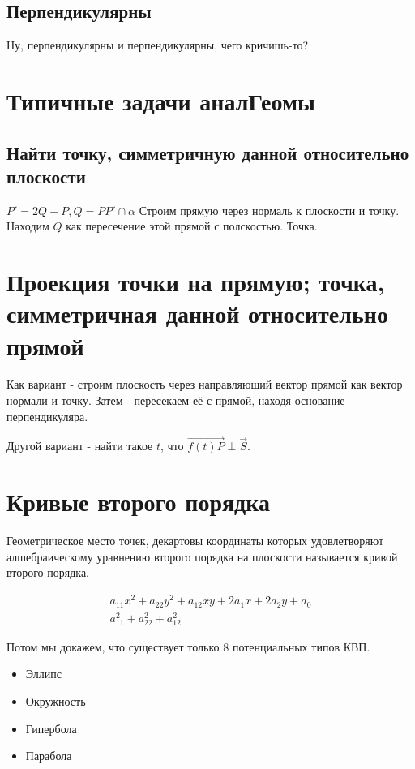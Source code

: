 \documentclass[12pt, a4paper]{article}
\begin{document}
    \subsection{Перпендикулярны}
    Ну, перпендикулярны и перпендикулярны, чего кричишь-то?

    \section{Типичные задачи аналГеомы}

    \subsection{Найти точку, симметричную данной относительно плоскости}

    $P' = 2Q - P, Q = PP' \cap \alpha$
    Строим прямую через нормаль к плоскости и точку. Находим $Q$ как пересечение этой прямой с полскостью. Точка.

    \section{Проекция точки на прямую; точка, симметричная данной относительно прямой}

    Как вариант - строим плоскость через направляющий вектор прямой как вектор нормали и точку.
    Затем - пересекаем её с прямой, находя основание перпендикуляра.

    Другой вариант - найти такое $t$, что $\overrightarrow{f(t)P} \perp \vec{S}$.


    \section{Кривые второго порядка}

    \begin{definition}

        Геометрическое место точек, декартовы координаты которых удовлетворяют алшебраическому уравнению второго порядка на плоскости называется кривой второго порядка.
    \end{definition}
    
    \begin{gather}
        a_{11} x^2 + a_{22} y^2 + a_{12} xy + 2a_1 x + 2 a_2 y + a_0 \\
        a_{11}^2 + a_{22}^2 + a_{12}^2
    \end{gather}


    Потом мы докажем, что существует только 8 потенциальных типов КВП.
    \begin{itemize}
        \item Эллипс
        \item Окружность
        \item Гипербола
        \item Парабола 
    \end{itemize}
\end{document}
